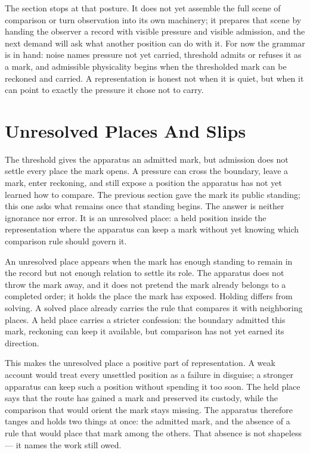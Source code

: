 The section stops at that posture. It does not yet assemble the full scene of comparison or turn observation into its own machinery; it prepares that scene by handing the observer a record with visible pressure and visible admission, and the next demand will ask what another position can do with it. For now the grammar is in hand: noise names pressure not yet carried, threshold admits or refuses it as a mark, and admissible physicality begins when the thresholded mark can be reckoned and carried. A representation is honest not when it is quiet, but when it can point to exactly the pressure it chose not to carry.

\section{Unresolved Places And Slips}

The threshold gives the apparatus an admitted mark, but admission does not settle every place the mark opens. A pressure can cross the boundary, leave a mark, enter reckoning, and still expose a position the apparatus has not yet learned how to compare. The previous section gave the mark its public standing; this one asks what remains once that standing begins. The answer is neither ignorance nor error. It is an unresolved place: a held position inside the representation where the apparatus can keep a mark without yet knowing which comparison rule should govern it.

An unresolved place appears when the mark has enough standing to remain in the record but not enough relation to settle its role. The apparatus does not throw the mark away, and it does not pretend the mark already belongs to a completed order; it holds the place the mark has exposed. Holding differs from solving. A solved place already carries the rule that compares it with neighboring places. A held place carries a stricter confession: the boundary admitted this mark, reckoning can keep it available, but comparison has not yet earned its direction.

This makes the unresolved place a positive part of representation. A weak account would treat every unsettled position as a failure in disguise; a stronger apparatus can keep such a position without spending it too soon. The held place says that the route has gained a mark and preserved its custody, while the comparison that would orient the mark stays missing. The apparatus therefore tanges and holds two things at once: the admitted mark, and the absence of a rule that would place that mark among the others. That absence is not shapeless --- it names the work still owed.

